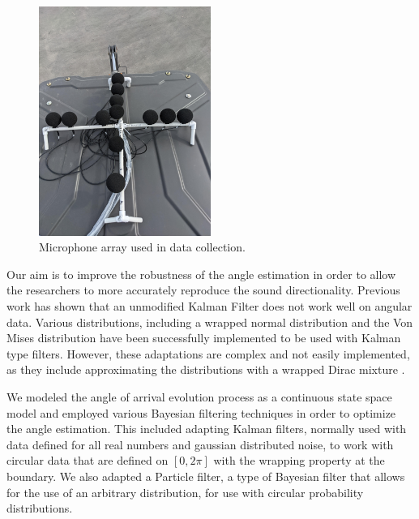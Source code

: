 \documentclass[11pt]{amsart}
\begin{document}
\begin{figure}[htp]
\includegraphics*[width=0.5\textwidth]{Pic of Real Mic Array.jpg}\hfill
\caption{Microphone array used in data collection.}
\label{fig:array}
\end{figure}

Our aim is to improve the robustness of the angle estimation in order to allow the researchers to more accurately reproduce the sound directionality. Previous work has shown that an unmodified Kalman Filter does not work well on angular data\cite{Research}. Various distributions, including a wrapped normal distribution and the Von Mises distribution have been successfully implemented to be used with Kalman type filters. However, these adaptations are complex and not easily implemented, as they include approximating the distributions with a wrapped Dirac mixture \cite{Research}.

We modeled the angle of arrival evolution process as a continuous state space model and employed various Bayesian filtering techniques in order to optimize the angle estimation. This included adapting Kalman filters, normally used with data defined for all real numbers and gaussian distributed noise, to work with circular data that are defined on $[0,2\pi]$ with the wrapping property at the boundary. We also adapted a Particle filter, a type of Bayesian filter that allows for the use of an arbitrary distribution, for use with circular probability distributions.




\end{document}
